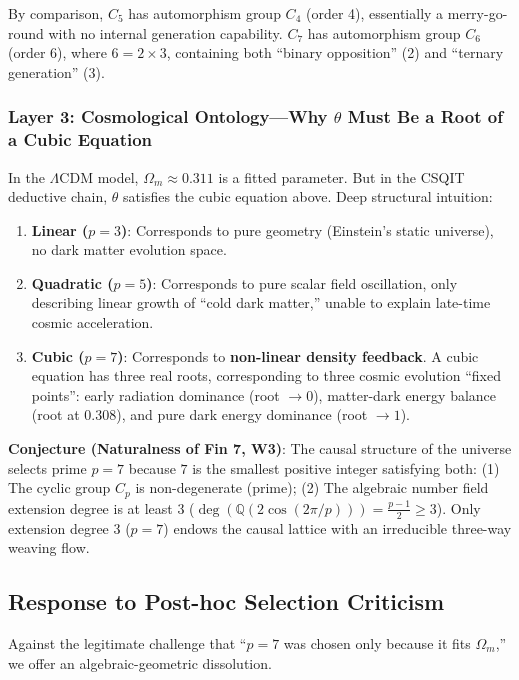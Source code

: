 \documentclass[aps,prd,twocolumn,nofootinbib,floatfix]{revtex4-2}
\begin{document}
By comparison, $C_5$ has automorphism group $C_4$ (order 4), essentially a merry-go-round with no internal generation capability. $C_7$ has automorphism group $C_6$ (order 6), where $6 = 2 \times 3$, containing both ``binary opposition'' (2) and ``ternary generation'' (3).

\subsubsection{Layer 3: Cosmological Ontology---Why $\theta$ Must Be a Root of a Cubic Equation}

In the $\Lambda$CDM model, $\Omega_m \approx 0.311$ is a fitted parameter. But in the CSQIT deductive chain, $\theta$ satisfies the cubic equation above. Deep structural intuition:
\begin{enumerate}
    \item \textbf{Linear ($p=3$)}: Corresponds to pure geometry (Einstein's static universe), no dark matter evolution space.
    \item \textbf{Quadratic ($p=5$)}: Corresponds to pure scalar field oscillation, only describing linear growth of ``cold dark matter,'' unable to explain late-time cosmic acceleration.
    \item \textbf{Cubic ($p=7$)}: Corresponds to \textbf{non-linear density feedback}. A cubic equation has three real roots, corresponding to three cosmic evolution ``fixed points'': early radiation dominance (root $\to 0$), matter-dark energy balance (root at 0.308), and pure dark energy dominance (root $\to 1$).
\end{enumerate}

\textbf{Conjecture (Naturalness of Fin 7, W3)}: The causal structure of the universe selects prime $p=7$ because $7$ is the smallest positive integer satisfying both: (1) The cyclic group $C_p$ is non-degenerate (prime); (2) The algebraic number field extension degree is at least 3 ($\deg(\mathbb{Q}(2\cos(2\pi/p))) = \frac{p-1}{2} \ge 3$). Only extension degree 3 ($p=7$) endows the causal lattice with an irreducible three-way weaving flow.

\subsection{Response to Post-hoc Selection Criticism}

Against the legitimate challenge that ``$p=7$ was chosen only because it fits $\Omega_m$,'' we offer an algebraic-geometric dissolution.
\end{document}
